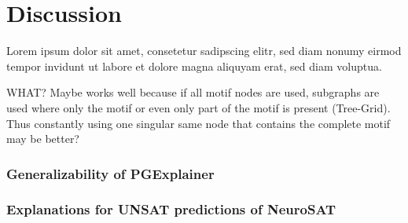 \chapter{Discussion}

Lorem ipsum dolor sit amet, consetetur sadipscing elitr, sed diam nonumy eirmod tempor invidunt ut labore et dolore magna aliquyam erat, sed diam voluptua.



WHAT? Maybe works well because if all motif nodes are used, subgraphs are used where only the motif or even only part of the motif is present (Tree-Grid). Thus constantly using one singular same node that contains the complete motif may be better? \bigskip


\subsection{Generalizability of PGExplainer}


\subsection{Explanations for UNSAT predictions of NeuroSAT}

